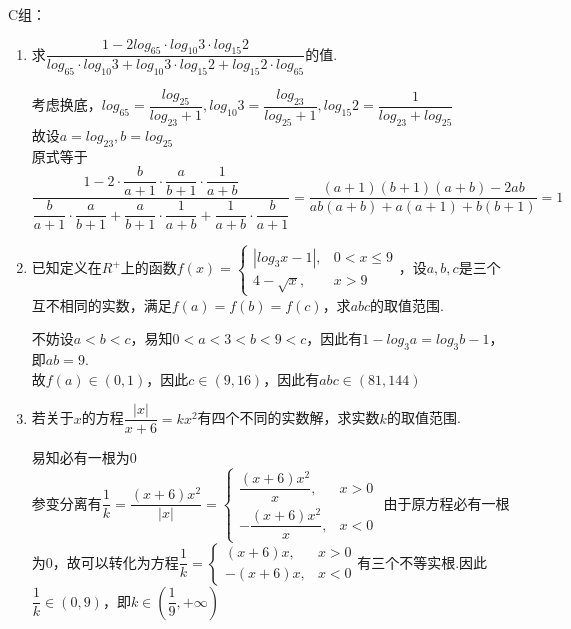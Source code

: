 C组：
\begin{enumerate}
    \item 求$\dfrac{1-2log_65 \cdot log_{10}3 \cdot log_{15}2}{log_65 \cdot log_{10}3 + log_{10}3 \cdot log_{15}2 + log_{15}2 \cdot log_65}$的值.
    \begin{jieda}
        考虑换底，$log_65 = \dfrac{log_25}{log_23+1}, log_{10}3 = \dfrac{log_23}{log_25+1}, log_{15}2 = \dfrac{1}{log_23 + log_25}$\\
        故设$a = log_23, b = log_25$\\
        原式等于$\dfrac{1 - 2 \cdot \dfrac{b}{a+1} \cdot \dfrac{a}{b+1} \cdot \dfrac{1}{a+b}}{\dfrac{b}{a+1}\cdot \dfrac{a}{b+1} + \dfrac{a}{b+1} \cdot \dfrac{1}{a+b} + \dfrac{1}{a+b} \cdot \dfrac{b}{a+1}} = \dfrac{(a+1)(b+1)(a+b) - 2ab}{ab(a+b) + a(a+1) + b(b+1)} = 1$
    \end{jieda}
    \item 已知定义在$R^{+}$上的函数$f(x) = \left \{\begin{array}{ll}
        |log_3x - 1|, & 0 < x \leq 9 \\
        4-\sqrt{x}, & x > 9
    \end{array} \right.$，设$a, b, c$是三个互不相同的实数，满足$f(a) = f(b) = f(c)$，求$abc$的取值范围.
    \begin{jieda}
        不妨设$a < b < c$，易知$0 < a < 3 < b < 9< c$，因此有$1 - log_3a = log_3b - 1$，即$ab = 9$. \\
        故$f(a) \in (0, 1)$，因此$c \in (9, 16)$，因此有$abc \in (81, 144)$
    \end{jieda}
    \item 若关于$x$的方程$\dfrac{|x|}{x+6} = kx^2$有四个不同的实数解，求实数$k$的取值范围.
    \begin{jieda}
        易知必有一根为0 \\
        参变分离有$\dfrac{1}{k} = \dfrac{(x+6)x^2}{|x|} = \left \{ \begin{array}{ll}
            \dfrac{(x+6)x^2}{x}, & x > 0 \\
            -\dfrac{(x+6)x^2}{x},  & x < 0
        \end{array}\right.$
        由于原方程必有一根为0，故可以转化为方程$\dfrac{1}{k} = \left \{ \begin{array}{ll}
            (x+6)x, & x > 0 \\
            -(x+6)x,  & x < 0
        \end{array}\right.$有三个不等实根.因此$\dfrac{1}{k} \in (0, 9)$，即$k \in (\dfrac{1}{9}, +\infty)$
    \end{jieda}
\end{enumerate}

